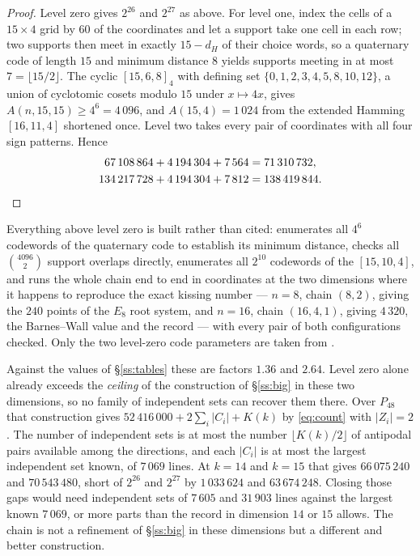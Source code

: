 \documentclass[11pt]{amsart}
\theoremstyle{remark}
\newcommand{\Pff}{P_{48}}
\begin{document}
\begin{proof}
Level zero gives $2^{26}$ and $2^{27}$ as above. For level one, index the cells of a
$15\times4$ grid by $60$ of the coordinates and let a support take one cell in each
row; two supports then meet in exactly $15-d_H$ of their choice words, so a
quaternary code of length $15$ and minimum distance $8$ yields supports meeting in
at most $7=\lfloor15/2\rfloor$. The cyclic $[15,6,8]_4$ with defining set
$\{0,1,2,3,4,5,8,10,12\}$, a union of cyclotomic cosets modulo $15$ under
$x\mapsto4x$, gives $A(n,15,15)\ge4^6=4\,096$, and $A(15,4)=1\,024$ from the
extended Hamming $[16,11,4]$ shortened once. Level two takes every pair of
coordinates with all four sign patterns. Hence
\begin{align*}
  67\,108\,864+4\,194\,304+7\,564 &= 71\,310\,732,\\
  134\,217\,728+4\,194\,304+7\,812 &= 138\,419\,844 . \qedhere
\end{align*}
\end{proof}

Everything above level zero is built rather than cited: \cite{repo} enumerates all
$4^6$ codewords of the quaternary code to establish its minimum distance, checks all
$\binom{4096}{2}$ support overlaps directly, enumerates all $2^{10}$ codewords of the
$[15,10,4]$, and runs the whole chain end to end in coordinates at the two dimensions
where it happens to reproduce the exact kissing number --- $n=8$, chain $(8,2)$,
giving the $240$ points of the $E_8$ root system, and $n=16$, chain $(16,4,1)$, giving
$4\,320$, the Barnes--Wall value and the record --- with every pair of both
configurations checked. Only the two level-zero code parameters are taken from
\cite{codetables}.

Against the values of \S\ref{ss:tables} these are factors $1.36$ and $2.64$. Level
zero alone already exceeds the \emph{ceiling} of the construction of
\S\ref{ss:big} in these two dimensions, so no family of independent sets can
recover them there. Over $\Pff$ that construction gives
$52\,416\,000+2\sum_i|C_i|+K(k)$ by \eqref{eq:count} with $|Z_i|=2$. The number
of independent sets is at most the number $\lfloor K(k)/2\rfloor$ of antipodal
pairs available among the directions, and each $|C_i|$ is at most the largest
independent set known, of $7\,069$ lines. At $k=14$ and $k=15$ that gives
$66\,075\,240$ and $70\,543\,480$, short of $2^{26}$ and $2^{27}$ by
$1\,033\,624$ and $63\,674\,248$. Closing those gaps would need independent sets
of $7\,605$ and $31\,903$ lines against the largest known $7\,069$, or more parts
than the record in dimension $14$ or $15$ allows. The chain is not a refinement of
\S\ref{ss:big} in these dimensions but a different and better construction.
\end{document}

